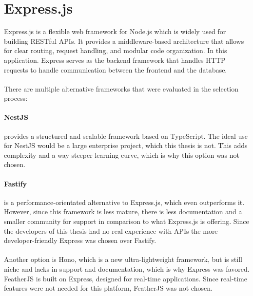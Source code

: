 \documentclass[a4paper,12pt]{report}
\begin{document}
\section{Express.js}
Express.js is a flexible web framework for Node.js which is widely used for building RESTful APIs. It provides a middleware-based architecture that allows for clear routing, request handling, and modular code organization. In this application. Express serves as the backend framework that handles HTTP requests to handle communication between the frontend and the database. \cite{expr-base} \\ \\
There are multiple alternative frameworks that were evaluated in the selection process:
\paragraph{NestJS} provides a structured and scalable framework based on TypeScript. The ideal use for NestJS would be a large enterprise project, which this thesis is not. This adds complexity and a way steeper learning curve, which is why this option was not chosen. \cite{expr-comp}\cite{expr-comp2}\cite{nest-js}
\paragraph{Fastify} is a performance-orientated alternative to Express.js, which even outperforms it. However, since this framework is less mature, there is less documentation and a smaller community for support in comparison to what Express.js is offering. Since the developers of this thesis had no real experience with APIs the more developer-friendly Express was chosen over Fastify. \cite{expr-comp} \cite{expr-comp2} \\ \\
Another option is Hono, which is a new ultra-lightweight framework, but is still niche and lacks in support and documentation, which is why Express was favored. FeatherJS is built on Express, designed for real-time applications. Since real-time features were not needed for this platform, FeatherJS was not chosen. \cite{expr-comp} \cite{expr-comp2}
\end{document}
